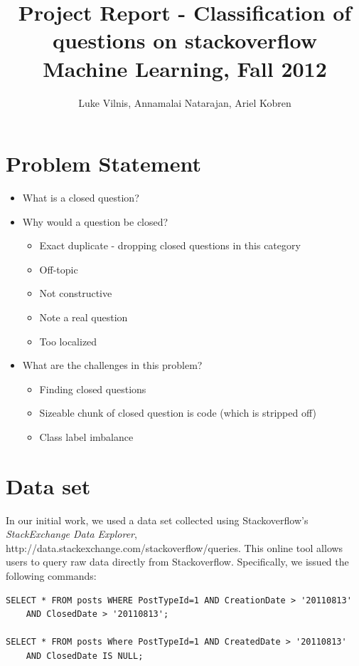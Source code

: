 \documentclass[11pt]{article}
\title{Project Report - Classification of questions on stackoverflow\\ Machine Learning, Fall 2012}
\author{Luke Vilnis, Annamalai Natarajan, Ariel Kobren}
\begin{document}
\sloppy

\maketitle
\tableofcontents
\pagebreak

\section{Problem Statement}
\begin{itemize}
\item What is a closed question?
\item Why would a question be closed?
	\begin{itemize}
	\item Exact duplicate - dropping closed questions in this category
	\item Off-topic
	\item Not constructive
	\item Note a real question
	\item Too localized
	\end{itemize}
\item What are the challenges in this problem?
	\begin{itemize}
	\item Finding closed questions
	\item Sizeable chunk of closed question is code (which is stripped off)
	\item Class label imbalance
	\end{itemize}
\end{itemize}

\section{Data set}
In our initial work, we used a data set collected using
Stackoverflow's \emph{StackExchange Data Explorer},
http://data.stackexchange.com/stackoverflow/queries. This online tool
allows users to query raw data directly from
Stackoverflow. Specifically, we issued the following commands:

\begin{verbatim}
SELECT * FROM posts WHERE PostTypeId=1 AND CreationDate > '20110813'
    AND ClosedDate > '20110813';

SELECT * FROM posts Where PostTypeId=1 AND CreatedDate > '20110813'
    AND ClosedDate IS NULL;
\end{verbatim}
\end{document}
